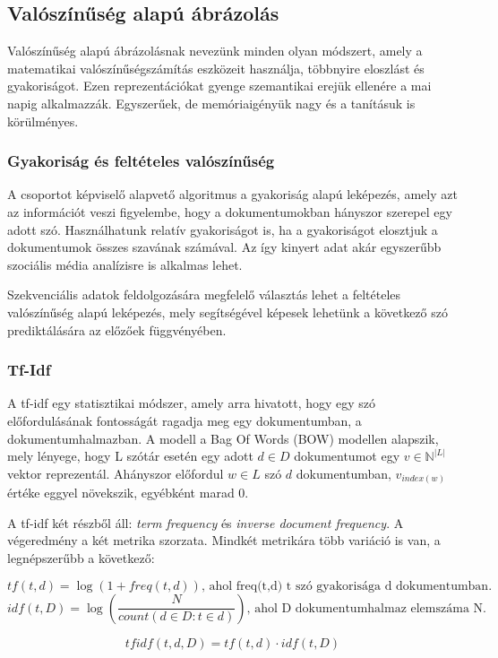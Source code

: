 \subsection{Valószínűség alapú ábrázolás}

Valószínűség alapú ábrázolásnak nevezünk minden olyan módszert, amely a matematikai valószínűségszámítás eszközeit használja, többnyire eloszlást és gyakoriságot. Ezen reprezentációkat gyenge szemantikai erejük ellenére a mai napig alkalmazzák. Egyszerűek, de memóriaigényük nagy és a tanításuk is körülményes.

\subsubsection{Gyakoriság és feltételes valószínűség}

A csoportot képviselő alapvető algoritmus a gyakoriság alapú leképezés, amely azt az információt veszi figyelembe, hogy a dokumentumokban hányszor szerepel egy adott szó. Használhatunk relatív gyakoriságot is, ha a gyakoriságot elosztjuk a dokumentumok összes szavának számával. Az így kinyert adat akár egyszerűbb szociális média analízisre is alkalmas lehet.

Szekvenciális adatok feldolgozására megfelelő választás lehet a feltételes valószínűség alapú leképezés, mely segítségével képesek lehetünk a következő szó prediktálására az előzőek függvényében.


\subsubsection{Tf-Idf}

A tf-idf egy statisztikai módszer, amely arra hivatott, hogy egy szó előfordulásának fontosságát ragadja meg egy dokumentumban, a dokumentumhalmazban. A modell a Bag Of Words (BOW) modellen alapszik, mely lényege, hogy L szótár esetén egy adott $d \in D$ dokumentumot egy $v \in \mathbb{N}^{|L|}$ vektor reprezentál. Ahányszor előfordul $w \in L$ szó $d$ dokumentumban, $v_{index(w)}$ értéke eggyel növekszik, egyébként marad 0. 

A tf-idf két részből áll: \textit{term frequency} és \textit{inverse document frequency}. A végeredmény a két metrika szorzata. Mindkét metrikára több variáció is van, a legnépszerűbb a következő:

\begin{definition}
$$tf\left(t,d\right) = \log \left( 1 + freq\left(t,d\right)\right) \text{, ahol freq(t,d) t szó gyakorisága d dokumentumban.}$$
$$idf\left(t,D\right) = \log \left( \frac{N}{count \left( d \in D:t \in d \right) } \right) \text{, ahol D dokumentumhalmaz elemszáma N.}$$

$$tfidf(t,d,D) = tf(t,d) \cdot idf(t,D)$$

\end{definition}



